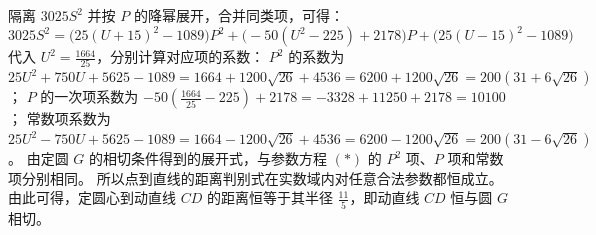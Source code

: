 \begin{solution}
隔离 $3025 S^2$ 并按 $P$ 的降幂展开，合并同类项，可得：
$$ 3025 S^2 = \big( 25(U + 15)^2 - 1089 \big)P^2 + \big( -50(U^2 - 225) + 2178 \big)P + \big( 25(U - 15)^2 - 1089 \big) $$
代入 $U^2 = \frac{1664}{25}$，分别计算对应项的系数：
$P^2$ 的系数为 $25U^2 + 750U + 5625 - 1089 = 1664 + 1200\sqrt{26} + 4536 = 6200 + 1200\sqrt{26} = 200(31 + 6\sqrt{26})$；
$P$ 的一次项系数为 $-50\left(\frac{1664}{25} - 225\right) + 2178 = -3328 + 11250 + 2178 = 10100$；
常数项系数为 $25U^2 - 750U + 5625 - 1089 = 1664 - 1200\sqrt{26} + 4536 = 6200 - 1200\sqrt{26} = 200(31 - 6\sqrt{26})$。
由定圆 $G$ 的相切条件得到的展开式，与参数方程 $(*)$ 的 $P^2$ 项、$P$ 项和常数项分别相同。
所以点到直线的距离判别式在实数域内对任意合法参数都恒成立。
由此可得，定圆心到动直线 $CD$ 的距离恒等于其半径 $\frac{11}{5}$，即动直线 $CD$ 恒与圆 $G$ 相切。

\end{solution}


